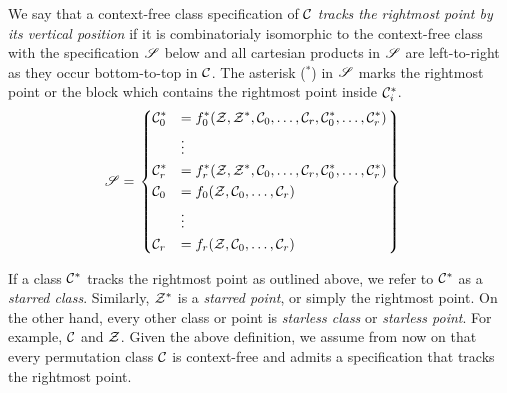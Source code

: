 \documentclass[12pt, a4paper, twoside]{report}
\begin{document}
\begin{definition}
  We say that a context-free class specification of $\mathcal{C}$ \emph{tracks the rightmost point by its vertical position} if it is combinatorialy isomorphic to the context-free class with the specification $\mathscr{S}$ below and all cartesian products in $\mathscr{S}$ are left-to-right as they occur bottom-to-top in $\mathcal{C}$. The asterisk (${}^*$) in $\mathscr{S}$ marks the rightmost point or the block which contains the rightmost point inside $\mathcal{C}_i^*$.
  \begin{align*}
\mathscr{S} &=  \begin{rcases}\begin{dcases}
  \mathcal{C}_0^* &= f_0^*(\mathcal{Z},\mathcal{Z}^*,\mathcal{C}_0,\ldots,\mathcal{C}_r,\mathcal{C}_0^*,\ldots,\mathcal{C}_r^*)\\
       &\vdots\\
  \mathcal{C}_r^* &= f_r^*(\mathcal{Z},\mathcal{Z}^*,\mathcal{C}_0,\ldots,\mathcal{C}_r,\mathcal{C}_0^*,\ldots,\mathcal{C}_r^*)\\
  \mathcal{C}_0 &= f_0(\mathcal{Z},\mathcal{C}_0,\ldots,\mathcal{C}_r)\\
       &\vdots\\
       \mathcal{C}_r &= f_r(\mathcal{Z},\mathcal{C}_0,\ldots,\mathcal{C}_r)
       \end{dcases}
     \end{rcases}
   \end{align*}
\end{definition}
If a class $\mathcal{C}^*$ tracks the rightmost point as outlined above, we refer to $\mathcal{C}^*$ as a \emph{starred class}. Similarly, $\mathcal{Z}^*$ is a \emph{starred point}, or simply the rightmost point. On the other hand, every other class or point is \emph{starless class} or \emph{starless point}. For example, $\mathcal{C}$ and $\mathcal{Z}$. Given the above definition, we assume from now on that every permutation class $\mathcal{C}$ is context-free and admits a specification that tracks the rightmost point. 
\end{document}
